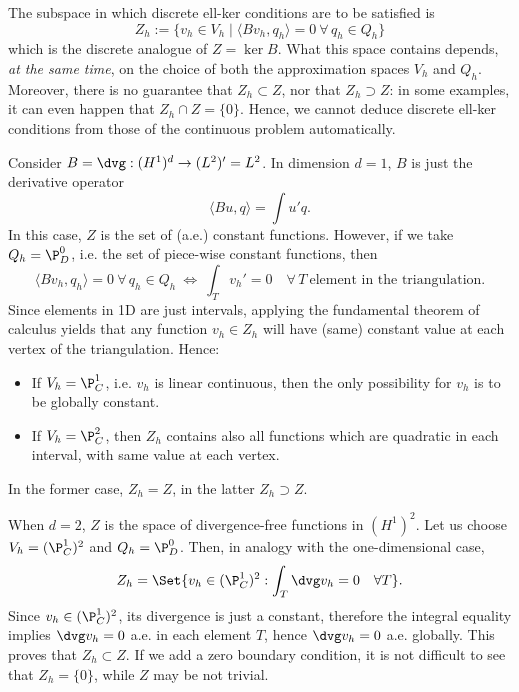 The subspace in which discrete ell-ker conditions are to be satisfied is
\begin{equation*}
	Z_h:=\{ v_h\in V_h \mid \langle Bv_h,q_h\rangle=0 \ \forall\,q_h\in Q_h \}
\end{equation*}
which is the discrete analogue of $Z = \ker B$. What this space contains depends, \emph{at the same time}, on the choice of both the approximation spaces $V_h$ and $Q_h$. Moreover, there is no guarantee that $Z_h \subset Z$, nor that $Z_h \supset Z$: in some examples, it can even happen that $Z_h \cap Z = \{ 0 \}$. Hence, we cannot deduce discrete ell-ker conditions from those of the continuous problem automatically.
\begin{example}
    Consider $B=\dvg: (H^1)^d \to (L^2)' = L^2$. In dimension $d=1$, $B$ is just the derivative operator
    \[
    \langle Bu, q \rangle = \int u' q.
    \]
    In this case, $Z$ is the set of (a.e.) constant functions. However, if we take $Q_h = \P_D^0$, i.e. the set of piece-wise constant functions, then
    \begin{equation*}
        \langle Bv_h,q_h\rangle=0 \ \forall\, q_h\in Q_h \ \iff \ \int_T v_h'=0 \quad \forall \, T \ \text{element in the triangulation}.
    \end{equation*}
    Since elements in 1D are just intervals, applying the fundamental theorem of calculus yields that any function $v_h \in Z_h$ will have (same) constant value at each vertex of the triangulation. Hence:
    \begin{itemize}
    	\item If $V_h = \P_C^1$, i.e. $v_h$ is linear continuous, then the only possibility for $v_h$ is to be globally constant.
    	\item If $V_h = \P_C^2$, then $Z_h$ contains also all functions which are quadratic in each interval, with same value at each vertex.
    \end{itemize}
	In the former case, $Z_h = Z$, in the latter $Z_h \supset Z$.
	
	When $d=2$, $Z$ is the space of divergence-free functions in $(H^1)^2$. Let us choose $V_h = (\P_C^1)^2$ and $Q_h = \P_D^0$. Then, in analogy with the one-dimensional case,
	\[
	Z_h = \Set{ v_h \in (\P_C^1)^2 : \int_T \dvg v_h = 0 \quad \forall T}.
	\]
	Since $v_h \in (\P_C^1)^2$, its divergence is just a constant, therefore the integral equality implies $\dvg v_h = 0$ a.e. in each element $T$, hence $\dvg v_h = 0$ a.e. globally. This proves that $Z_h \subset Z$. If we add a zero boundary condition, it is not difficult to see that $Z_h = \{0\}$, while $Z$ may be not trivial.
\end{example}

